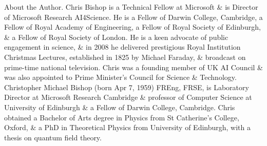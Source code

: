 \documentclass{article}
\begin{document}
\begin{enumerate}
\begin{itemize}
		{\sf About the Author.} {\sc Chris Bishop} is a Technical Fellow at Microsoft \& is Director of Microsoft Research AI4Science. He is a Fellow of Darwin College, Cambridge, a Fellow of Royal Academy of Engineering, a Fellow of Royal Society of Edinburgh, \& a Fellow of Royal Society of London. He is a keen advocate of public engagement in science, \& in 2008 he delivered prestigious Royal Institution Christmas Lectures, established in 1825 by {\sc Michael Faraday}, \& broadcast on prime-time national television. {\sc Chris} was a founding member of UK AI Council \& was also appointed to Prime Minister's Council for Science \& Technology. {\sc Christopher Michael Bishop} (born Apr 7, 1959) FREng, FRSE, is Laboratory Director at Microsoft Research Cambridge \& professor of Computer Science at University of Edinburgh \& a Fellow of Darwin College, Cambridge. {\sc Chris} obtained a Bachelor of Arts degree in Physics from St Catherine's College, Oxford, \& a PhD in Theoretical Physics from University of Edinburgh, with a thesis on quantum field theory.
		

\end{itemize}
\end{enumerate}
\end{document}

